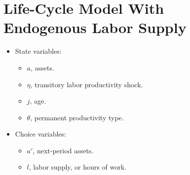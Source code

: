 \documentclass[11pt]{article}
\begin{document}
\section{Life-Cycle Model With Endogenous Labor Supply}

\begin{itemize}
\item State variables:

\begin{itemize}
\item $a$, assets.

\item $\eta$, transitory labor productivity shock.

\item $j$, age.

\item $\theta$, permanent productivity type.
\end{itemize}

\item Choice variables:

\begin{itemize}
\item $a'$, next-period assets.

\item $l$, labor supply, or hours of work.
\end{itemize}


\end{itemize}
\end{document}
